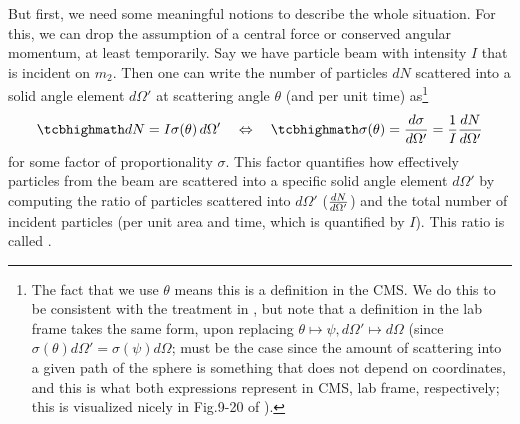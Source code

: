 \documentclass[../class_mech_main.tex]{subfiles}
\begin{document}
But first, we need some meaningful notions to describe the whole situation. For this, we can drop the assumption of a central force or conserved angular momentum, at least temporarily. Say we have particle beam with intensity $I$ that is incident on $m_2$. Then one can write the number of particles $dN$ scattered into a solid angle element $d\Omega'$ at scattering angle $\theta$ (and per unit time) as\footnote{The fact that we use $\theta$ means this is a definition in the CMS. We do this to be consistent with the treatment in \cite{Thornton_2003}, but note that a definition in the lab frame takes the same form, upon replacing $\theta \mapsto \psi, d\Omega' \mapsto d\Omega$ (since $\sigma(\theta) d\Omega' = \sigma(\psi) d\Omega$; must be the case since the amount of scattering into a given path of the sphere is something that does not depend on coordinates, and this is what both expressions represent in CMS, lab frame, respectively; this is visualized nicely in Fig.9-20 of \cite{Thornton_2003}).}
\begin{equation}\label{eq:cross_section_cms}
	\eqbox{
		dN = I \sigma(\theta) \, d\Omega'
	}
	\quad \Leftrightarrow \quad
	\eqbox{
		\sigma(\theta) = \dv{\sigma}{\Omega'} = \frac{1}{I} \dv{N}{\Omega'}
	}
\end{equation}
for some factor of proportionality $\sigma$. This factor quantifies how effectively particles from the beam are scattered into a specific solid angle element $d\Omega'$ by computing the ratio of particles scattered into $d\Omega'$ ($\dv{N}{\Omega'}$) and the total number of incident particles (per unit area and time, which is quantified by $I$). This ratio is called .


\end{document}
